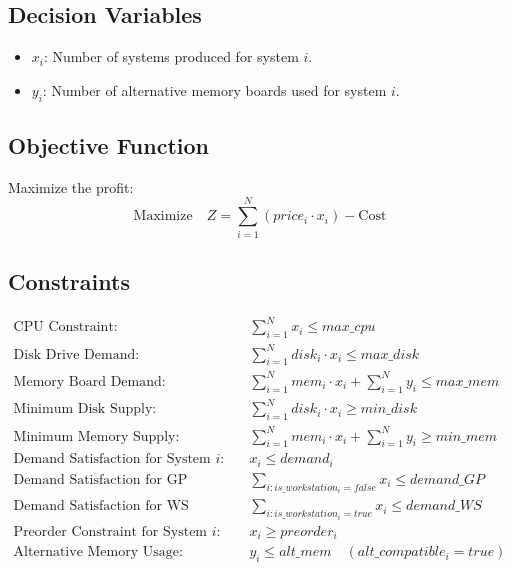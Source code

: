 \documentclass{article}
\begin{document}
\subsection*{Decision Variables}
\begin{itemize}
    \item $x_i$: Number of systems produced for system $i$.
    \item $y_i$: Number of alternative memory boards used for system $i$.
\end{itemize}

\subsection*{Objective Function}
Maximize the profit:
\[
\text{Maximize} \quad Z = \sum_{i=1}^{N} (price_i \cdot x_i) - \text{Cost}
\]

\subsection*{Constraints}
\begin{align*}
\text{CPU Constraint:} & \quad \sum_{i=1}^{N} x_i \leq max\_cpu \\
\text{Disk Drive Demand:} & \quad \sum_{i=1}^{N} disk_i \cdot x_i \leq max\_disk \\
\text{Memory Board Demand:} & \quad \sum_{i=1}^{N} mem_i \cdot x_i + \sum_{i=1}^{N} y_i \leq max\_mem \\
\text{Minimum Disk Supply:} & \quad \sum_{i=1}^{N} disk_i \cdot x_i \geq min\_disk \\
\text{Minimum Memory Supply:} & \quad \sum_{i=1}^{N} mem_i \cdot x_i + \sum_{i=1}^{N} y_i \geq min\_mem \\
\text{Demand Satisfaction for System } i: & \quad x_i \leq demand_i \\
\text{Demand Satisfaction for GP Family:} & \quad \sum_{i: is\_workstation_i = false} x_i \leq demand\_GP \\
\text{Demand Satisfaction for WS Family:} & \quad \sum_{i: is\_workstation_i = true} x_i \leq demand\_WS \\
\text{Preorder Constraint for System } i: & \quad x_i \geq preorder_i \\
\text{Alternative Memory Usage:} & \quad y_i \leq alt\_mem \quad (alt\_compatible_i = true)
\end{align*}
\end{document}
